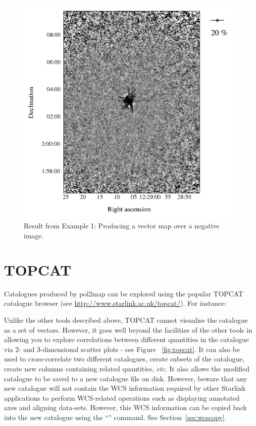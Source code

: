 \begin{figure}[t!]
\begin{center}
\includegraphics[width=0.75\linewidth]{sc22-kappa-plots-plot3.png}
\caption [Vector map with negative image in polplot]{Result from
  Example 1: Producing a vector map over a negative image.\label{fig:kappa-plot3}}
\end{center}
\end{figure}


\section{TOPCAT}

Catalogues produced by pol2map can be explored using the popular TOPCAT
catalogue browser (see \url{http://www.starlink.ac.uk/topcat/}). For
instance:

\begin{terminalv}
\end{terminalv}

Unlike the other tools described above, TOPCAT cannot visualise the
catalogue as a set of vectors. However, it goes well beyond the
facilities of the other tools in allowing you to explore correlations
between different quantities in the catalogue via 2- and 3-dimensional
scatter plots - see Figure~ \ref{fig:topcat}. It can also be used to
cross-correlate two different
catalogues, create subsets of the catalogue, create new columns
containing related quantities, \emph{etc}. It also allows the modified
catalogue to be saved to a new catalogue file on disk. However, beware
that any new catalogue will not contain the WCS information required
by other Starlink applications to perform WCS-related operations such as
displaying annotated axes and aligning data-sets. However, this WCS
information can be copied back into the new catalogue using the
``'' command. See Section~\ref{sec:wcscopy}.

